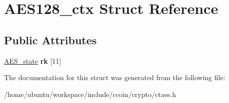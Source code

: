 \hypertarget{structAES128__ctx}{\section{A\-E\-S128\-\_\-ctx Struct Reference}
\label{structAES128__ctx}
}
\subsection*{Public Attributes}
\begin{DoxyCompactItemize}
\item 
\hypertarget{structAES128__ctx_abbeaa43481859ca3558ecc9ebc8784fe}{\hyperlink{structAES__state}{A\-E\-S\-\_\-state} {\bfseries rk} \mbox{[}11\mbox{]}}\label{structAES128__ctx_abbeaa43481859ca3558ecc9ebc8784fe}

\end{DoxyCompactItemize}


The documentation for this struct was generated from the following file\-:\begin{DoxyCompactItemize}
\item 
/home/ubuntu/workspace/include/ccoin/crypto/ctaes.\-h\end{DoxyCompactItemize}
